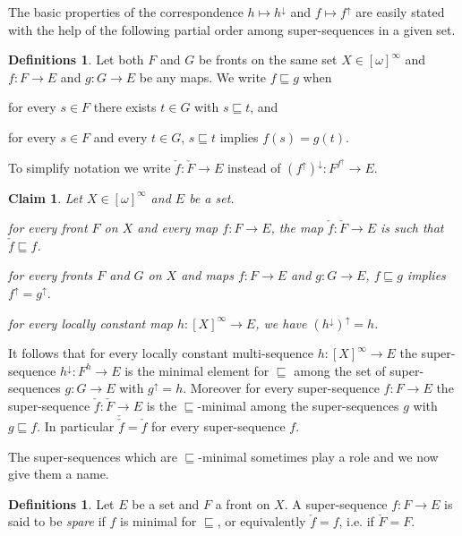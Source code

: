 \documentclass{article}%
\theoremstyle{plain}
\newtheorem{lemma}[theorem]{Properties}
\newtheorem{lemma}[theorem]{Lemma}
\newtheorem{lemma}[theorem]{Fact}
\newtheorem{lemma}[theorem]{Facts}
\newtheorem{lemma}{Claim}
\theoremstyle{definition}
\newtheorem{definition}[theorem]{Definition}
\newtheorem{definition}[theorem]{Notation}
\newtheorem{definition}[theorem]{Notations}
\newtheorem{definition}[theorem]{Definitions}
\theoremstyle{remark}
\DeclareMathOperator{\upcl}{\uparrow}
\DeclareMathOperator{\dcl}{\downarrow}
\newcommand{\segm} {\sqsubseteq}
\newcommand{\infSub}[1]{[#1]^{\infty}}
\begin{document}
The basic properties of the correspondence $h\mapsto h^{\dcl}$ and $f\mapsto f^{\upcl}$ are easily stated with the help of the following partial order among super-sequences in a given set.
 
 \begin{definition}
Let both $F$ and $G$ be fronts on the same set $X\in\infSub{\omega}$ and $f:F\to E$ and $g:G\to E$ be any maps. We write $f\segm g$ when
\begin{enumDefn}
\item for every $s\in F$ there exists $t\in G$ with $s\segm t$, and
\item for every $s\in F$ and every $t\in G$, $s\segm t$ implies $f(s)=g(t)$.
\end{enumDefn} 
\end{definition}

 

To simplify notation we write $\check{f}:\check{F}\to E$ instead of $(f^{\upcl})^{\dcl}:F^{f^{\upcl}}\to E$.

 
 \begin{lemma}\label{fac SpareIntOperator}
 Let $X\in\infSub{\omega}$ and $E$ be a set.
 \begin{enumThm}
 \item for every front $F$ on $X$ and every map $f:F\to E$, the map $\check{f}:\check{F}\to E$ is such that $\check{f}\segm f$.

 \item for every fronts $F$ and $G$ on $X$ and maps $f:F\to E$ and $g:G\to E$, $f\segm g$ implies $f^{\upcl}=g^{\upcl}$.
 \item for every locally constant map $h:\infSub{X}\to E$, we have $(h^{\dcl})^{\upcl}=h$.
 \end{enumThm}
 \end{lemma}
 
 It follows that for every locally constant multi-sequence $h:\infSub{X}\to E$ the super-sequence $h^{\dcl}:F^{h}\to E$ is the minimal element for $\segm$ among the set of super-sequences $g:G\to E$ with $g^{\upcl}=h$. Moreover for every super-sequence $f:F\to E$ the super-sequence $\check{f}:\check{F}\to E$ is the $\segm$-minimal among the super-sequences $g$ with $g\segm f$. In particular $\check{\check{f}}=\check{f}$ for every super-sequence $f$.
 
The super-sequences which are $\segm$-minimal sometimes play a role and we now give them a name.
 
 \begin{definition}
 Let $E$ be a set and $F$ a front on $X$. A super-sequence $f:F\to E$ is said to be \emph{spare} if $f$ is minimal for $\segm$, or equivalently $\check{f}=f$, i.e. if $\check{F}=F$.
 \end{definition}
\end{document}
